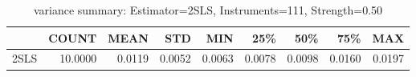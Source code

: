 \begin{table}[ht]
\centering
\caption{variance summary: Estimator=2SLS, Instruments=111, Strength=0.50}
\begin{tabular}{lrrrrrrrr}
\toprule
 & COUNT & MEAN & STD & MIN & 25\% & 50\% & 75\% & MAX \\
\midrule
2SLS & 10.0000 & 0.0119 & 0.0052 & 0.0063 & 0.0078 & 0.0098 & 0.0160 & 0.0197 \\
\bottomrule
\end{tabular}
\end{table}
